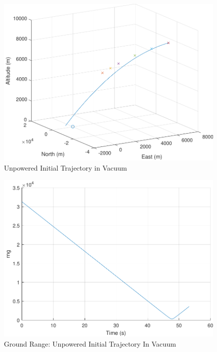 \begin{figure}[H]
	\centering
	\begin{minipage}{4.5 in}
		\includegraphics[width=\linewidth]{Figures/trajunpowvac_1.pdf}
		\caption{Unpowered Initial Trajectory in Vacuum \label{fig:trajunpowvac_1} }
	\end{minipage}
\end{figure}

\begin{figure}[H]
	\centering
	\begin{minipage}{4.5 in}
		\includegraphics[width=\linewidth]{Figures/trajunpowvacgr.pdf}
		\caption{Ground Range: Unpowered Initial Trajectory In Vacuum \label{fig:trajunpowvacgr} }
	\end{minipage}
\end{figure}

